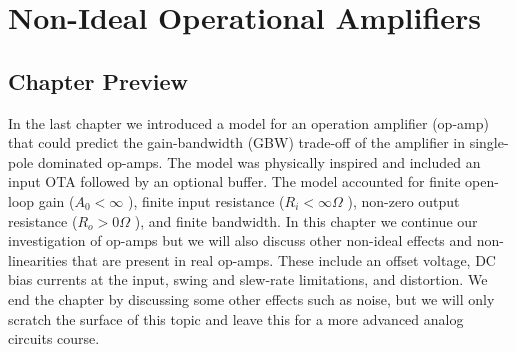 \chapter{Non-Ideal Operational Amplifiers}
\label{ch:ch18_opamp_real}
\graphicspath{{./figures/figs_ch18_opamp_real/}}
\section{Chapter Preview}
In the last chapter we introduced a model for an operation amplifier (op-amp) that could predict the gain-bandwidth (GBW) trade-off of the amplifier in single-pole dominated op-amps.  The model was physically inspired and included an input OTA followed by an optional buffer.   The model accounted for finite open-loop gain ($A_0 < \infty$ ), finite input resistance ($R_i < \infty\Omega$ ), non-zero output resistance ($R_o > 0\Omega$ ), and finite bandwidth.  In this chapter we continue our investigation of op-amps but we will also discuss other non-ideal effects and non-linearities that are present in real op-amps.  These include an offset voltage, DC bias currents at the input, swing and slew-rate limitations, and distortion.  We end the chapter by discussing some other effects such as noise, but we will only scratch the surface of this topic and leave this for a more advanced analog circuits course.
\newpage
